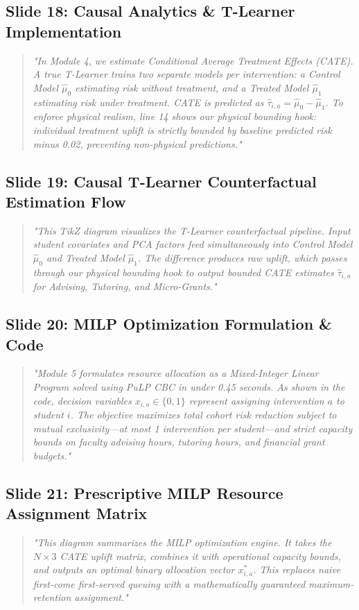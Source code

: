 \documentclass[11pt, a4paper]{article}
\begin{document}
\subsection{Slide 18: Causal Analytics \& T-Learner Implementation}
\begin{quote}\small \itshape
"In Module 4, we estimate Conditional Average Treatment Effects (CATE). A true T-Learner trains two separate models per intervention: a Control Model $\hat{\mu}_0$ estimating risk without treatment, and a Treated Model $\hat{\mu}_1$ estimating risk under treatment. CATE is predicted as $\hat{\tau}_{i,a} = \hat{\mu}_0 - \hat{\mu}_1$. To enforce physical realism, line 14 shows our physical bounding hook: individual treatment uplift is strictly bounded by baseline predicted risk minus 0.02, preventing non-physical predictions."
\end{quote}

\subsection{Slide 19: Causal T-Learner Counterfactual Estimation Flow}
\begin{quote}\small \itshape
"This TikZ diagram visualizes the T-Learner counterfactual pipeline. Input student covariates and PCA factors feed simultaneously into Control Model $\hat{\mu}_0$ and Treated Model $\hat{\mu}_1$. The difference produces raw uplift, which passes through our physical bounding hook to output bounded CATE estimates $\hat{\tau}_{i,a}$ for Advising, Tutoring, and Micro-Grants."
\end{quote}

\subsection{Slide 20: MILP Optimization Formulation \& Code}
\begin{quote}\small \itshape
"Module 5 formulates resource allocation as a Mixed-Integer Linear Program solved using PuLP CBC in under 0.45 seconds. As shown in the code, decision variables $x_{i,a} \in \{0, 1\}$ represent assigning intervention $a$ to student $i$. The objective maximizes total cohort risk reduction subject to mutual exclusivity---at most 1 intervention per student---and strict capacity bounds on faculty advising hours, tutoring hours, and financial grant budgets."
\end{quote}

\subsection{Slide 21: Prescriptive MILP Resource Assignment Matrix}
\begin{quote}\small \itshape
"This diagram summarizes the MILP optimization engine. It takes the $N \times 3$ CATE uplift matrix, combines it with operational capacity bounds, and outputs an optimal binary allocation vector $x_{i,a}^*$. This replaces naive first-come first-served queuing with a mathematically guaranteed maximum-retention assignment."
\end{quote}
\end{document}
